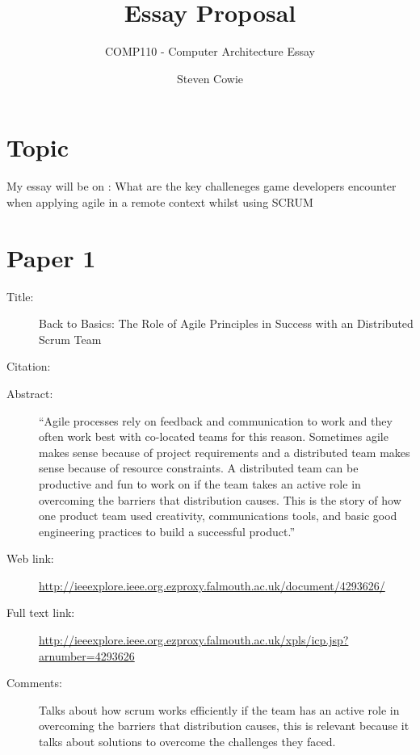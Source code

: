 \documentclass{scrartcl}
\title{Essay Proposal}
\subtitle{COMP110 - Computer Architecture Essay}
\author{Steven Cowie}
\begin{document}
\maketitle

\section*{Topic}

My essay will be on : What are the key challeneges game developers encounter when applying agile in a remote context whilst using SCRUM


\section*{Paper 1}
\begin{description}
\item[Title:] Back to Basics: The Role of Agile Principles in Success with an Distributed Scrum Team
\item[Citation:] \cite{4293626}
\item[Abstract:] ``Agile processes rely on feedback and communication to work and they often work best with co-located teams for this reason. Sometimes agile makes sense because of project requirements and a distributed team makes sense because of resource constraints. A distributed team can be productive and fun to work on if the team takes an active role in overcoming the barriers that distribution causes. This is the story of how one product team used creativity, communications tools, and basic good engineering practices to build a successful product.''
\item[Web link:] \url{http://ieeexplore.ieee.org.ezproxy.falmouth.ac.uk/document/4293626/}
\item[Full text link:] \url{http://ieeexplore.ieee.org.ezproxy.falmouth.ac.uk/xpls/icp.jsp?arnumber=4293626}
\item[Comments:] Talks about how scrum works efficiently if the team has an active role in overcoming the barriers that distribution causes, this is relevant because it talks about solutions to overcome the challenges they faced.
\end{description}
\end{document}

